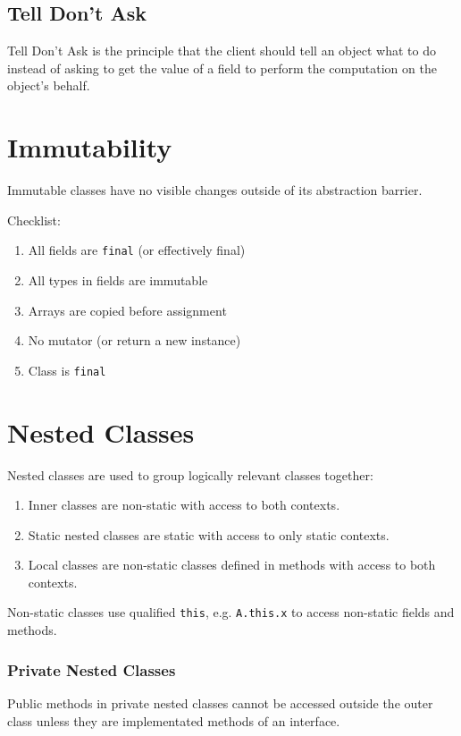 \documentclass[12pt, a4paper]{article}
\begin{document}
\begin{multicols*}{3}
\subsection{Tell Don't Ask}
Tell Don't Ask is the principle that the client should tell an object what to do instead of asking to get the value of a field to perform the computation on the object's behalf.

\colbreak
\section{Immutability}
Immutable classes have no visible changes outside of its abstraction barrier.

Checklist:
\begin{enumerate}[\roman*.]
  \item All fields are \lstinline|final| (or effectively final)
  \item All types in fields are immutable
  \item Arrays are copied before assignment
  \item No mutator (or return a new instance)
  \item Class is \lstinline|final|
\end{enumerate}
\section{Nested Classes}
Nested classes are used to group logically relevant classes together:
\begin{enumerate}[\roman*.]
  \item Inner classes are non-static with access to both contexts. 
  \item Static nested classes are static with access to only static contexts.
  \item Local classes are non-static classes defined in methods with access to both contexts.
\end{enumerate}

Non-static classes use qualified \lstinline|this|, e.g. \lstinline|A.this.x| to access non-static fields and methods.

\subsubsection{Private Nested Classes}
Public methods in private nested classes cannot be accessed outside the outer class unless they are implementated methods of an interface.


\end{multicols*}
\end{document}
